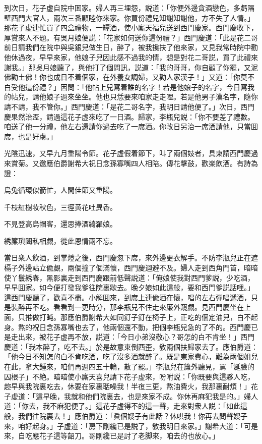 到次日，花子虚自院中囬家。婦人再三埋怨，説道：「你便外邊貪酒戀色，多虧隔壁西門大官人，兩次三番顧睦你來家。你買份禮兒知謝知謝他，方不失了人情。」那花子虚連忙買了四盒禮物，一罈酒，使小廝天福兒送到西門慶家。西門慶收下，厚賞來人不題。有吳月娘便説：「花家如何送你這份禮？」西門慶道：「此是花二哥前日請我們在院中與吳銀兒做生日，醉了，被我攙扶了他來家，又見我常時院中勸他休過夜，早早來家，他娘子兒因此感不過我的情，想是對花二哥説，買了此禮來謝我。」那吳月娘聽了，與他打了個問訊，説道：「我的哥哥，你自顧了你罷，又泥佛勸土佛！你也成日不着個家，在外養女調婦，又勸人家漢子！」又道：「你莫不白受他這份禮？」因問：「他帖上兒寫着誰的名字！若是他娘子的名字，今日寫我的帖兒，請他娘子過來坐坐。他也只恁要來咱家走走哩。若是他男子漢名字，隨你請不請，我不管你。」西門慶道：「是花二哥名字，我明日請他便了。」次日，西門慶果然治盃，請過這花子虚來吃了一日酒。歸家，李瓶兒説：「你不要差了禮數。咱送了他一分禮，他左右還請你過去吃了一席酒。你改日另治一席酒請他，只當囬席，也是好䖏。」

光陰迅速，又早九月重陽令節。花子虚假着節下，叫了兩個妓者，具柬請西門慶過來賞菊。又邀應伯爵謝希大祝日念孫寡嘴四人相陪。傳花擊鼓，歡楽飲酒。有詩為證：

\begin{myquote}
烏兔循環似箭忙，人間佳節又重陽。

千枝紅樹妆秋色，三徑黄花吐異香。

不見登高烏帽客，還思捧酒綺羅娘。

綉簾瑣闥私相覷，從此恩情兩不忘。
\end{myquote}

當日衆人飲酒，到掌燈之後，西門慶忽下席，來外邊更衣解手。不防李瓶兒正在遮槅子外邊站立偸覷，兩個撞了個滿懷，西門慶逥避不及。婦人走到西角門首，暗暗使丫鬟綉春，黑影裏走到西門慶跟前低聲説道：「俺娘使我對西門爹説，少吃酒，早早囬家。如今便打發我爹往院裏歇去。晚夕娘如此這般，要和西門爹説話哩。」這西門慶聽了，歡喜不盡。小解囬來，到席上連偸酒在懷，唱的左右彈唱遞酒，只是裝醉再不吃。看看到一更時分，那李瓶兒不住走來廉外窺覷。見西門慶坐在上面，只推做打盹。那應伯爵謝希大如同釘子釘在椅子上，正吃的個定油兒，白不起身。熬的祝日念孫寡嘴也去了，他兩個還不動，把個李瓶兒急的了不的。西門慶已是走出來，被花子虚再不放，説道：「今日小弟沒敬心？哥怎的白不肯坐！」西門慶道：「我本醉了，吃不去。」於是故意東倒西歪，敎兩個扶歸家去了。應伯爵道：「他今日不知怎的白不肯吃酒，吃了沒多酒就醉了。既是東家費心，難為兩個姐兒在此，拿大鍾來，咱們再週四五十輪，散了罷。」李瓶兒在簾外聽見，駡「涎臉的囚根子」不絶。暗暗使小廝天喜兒請下花子虚來，吩咐説：「你既要與這夥人吃，趂早與我院裏吃去，休要在家裏聒噪我！半亱三更，熬油費火，我那裏耐煩！」花子虚道：「這早晚，我就和他們院裏去，也是來家不成。你休再麻犯我是的。」婦人道：「你去，我不麻犯便了。」這花子虚得不的這一聲，走來對衆人説：「如此這般，我們往院裏去！」應伯爵道：「眞個嫂子有此話？休哄我！你再去問聲嫂子來，咱好起身。」子虚道：「房下剛纔已是説了，敎我明日來家。」謝希大道：「可是來，自吃應花子這等韶刀。哥剛纔已是討了老脚來，咱去的也放心。」

